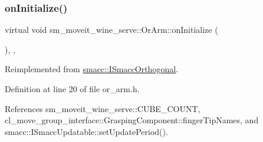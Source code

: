 \subsubsection{\texorpdfstring{on\+Initialize()}{onInitialize()}}
{\footnotesize\ttfamily virtual void sm\+\_\+moveit\+\_\+wine\+\_\+serve\+::\+Or\+Arm\+::on\+Initialize (\begin{DoxyParamCaption}{ }\end{DoxyParamCaption})\hspace{0.3cm}{\ttfamily [inline]}, {\ttfamily [override]}, {\ttfamily [virtual]}}



Reimplemented from \hyperlink{classsmacc_1_1ISmaccOrthogonal_a6bb31c620cb64dd7b8417f8705c79c7a}{smacc\+::\+I\+Smacc\+Orthogonal}.



Definition at line 20 of file or\+\_\+arm.\+h.



References sm\+\_\+moveit\+\_\+wine\+\_\+serve\+::\+C\+U\+B\+E\+\_\+\+C\+O\+U\+NT, cl\+\_\+move\+\_\+group\+\_\+interface\+::\+Grasping\+Component\+::finger\+Tip\+Names, and smacc\+::\+I\+Smacc\+Updatable\+::set\+Update\+Period().


